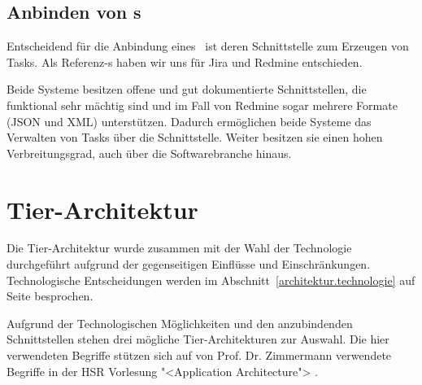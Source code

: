 		
		\subsection{Anbinden von \ppt s}
			Entscheidend für die Anbindung eines \ppt\ ist deren Schnittstelle zum Erzeugen von Tasks. 
			Als Referenz-\ppt s haben wir uns für Jira und Redmine entschieden.
			
			Beide Systeme besitzen offene und gut dokumentierte Schnittstellen, die funktional sehr mächtig sind und im Fall von Redmine sogar mehrere Formate (JSON und XML) unterstützen.
			Dadurch ermöglichen beide Systeme das Verwalten von Tasks über die Schnittstelle.
			Weiter besitzen sie einen hohen Verbreitungsgrad, auch über die Softwarebranche hinaus.
		

	\section{Tier-Architektur}
		Die Tier-Architektur wurde zusammen mit der Wahl der Technologie durchgeführt aufgrund der gegenseitigen Einflüsse und Einschränkungen.
		Technologische Entscheidungen werden im Abschnitt~\ref{architektur.technologie} auf 
Seite \pageref{architektur.technologie} besprochen.
		
		Aufgrund der Technologischen Möglichkeiten und den anzubindenden Schnittstellen stehen drei mögliche Tier-Architekturen zur Auswahl.
		Die hier verwendeten Begriffe stützen sich auf von Prof. Dr. Zimmermann verwendete Begriffe in der HSR Vorlesung "<Application Architecture"> \cite{prof._dr._zimmerman_layers_2014}.		
		
